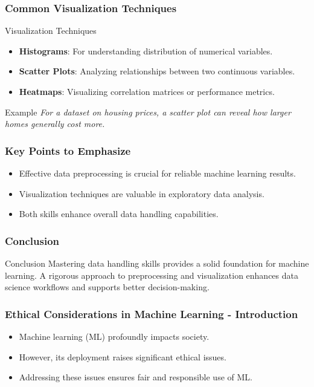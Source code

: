 \documentclass[aspectratio=169]{beamer}
\begin{document}
\begin{frame}[fragile]
    \frametitle{Common Visualization Techniques}
    \begin{block}{Visualization Techniques}
        \begin{itemize}
            \item \textbf{Histograms}: For understanding distribution of numerical variables.
            \item \textbf{Scatter Plots}: Analyzing relationships between two continuous variables.
            \item \textbf{Heatmaps}: Visualizing correlation matrices or performance metrics.
        \end{itemize}
    \end{block}
    
    \begin{block}{Example}
        \textit{For a dataset on housing prices, a scatter plot can reveal how larger homes generally cost more.}
    \end{block}
\end{frame}

\begin{frame}[fragile]
    \frametitle{Key Points to Emphasize}
    \begin{itemize}
        \item Effective data preprocessing is crucial for reliable machine learning results.
        \item Visualization techniques are valuable in exploratory data analysis.
        \item Both skills enhance overall data handling capabilities.
    \end{itemize}
\end{frame}

\begin{frame}[fragile]
    \frametitle{Conclusion}
    \begin{block}{Conclusion}
        Mastering data handling skills provides a solid foundation for machine learning. A rigorous approach to preprocessing and visualization enhances data science workflows and supports better decision-making.
    \end{block}
\end{frame}

\begin{frame}[fragile]
    \frametitle{Ethical Considerations in Machine Learning - Introduction}
    \begin{itemize}
        \item Machine learning (ML) profoundly impacts society.
        \item However, its deployment raises significant ethical issues.
        \item Addressing these issues ensures fair and responsible use of ML.
    \end{itemize}
\end{frame}
\end{document}
